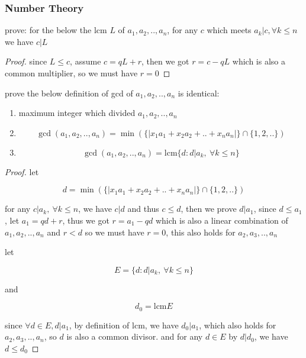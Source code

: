 \subsubsection{Number Theory}

\begin{exercise}
    prove: for the below the lcm $L$ of $a_1,a_2,..,a_n$, for any $c$ which meets $a_k | c, \forall k \le n$
    we have $c | L$
\end{exercise}

\begin{proof}
   since $L \le c$, assume $c = qL + r$, then we got $r = c - qL$ which is also a common multiplier,
   so we must have $r = 0$
\end{proof}


\begin{exercise}
    prove the below definition of gcd of $a_1,a_2,..,a_n$ is identical:

    \begin{enumerate}
        \item maximum integer which divided $a_1,a_2,..,a_n$

        \item

        \[
            \gcd(a_1,a_2,..,a_n) = \min \left( \{ \left|x_1a_1 + x_2a_2 + .. + x_na_n \right| \} \cap \{1,2,..\} \right)
        \]

        \item 

        \[
            \gcd(a_1,a_2,..,a_n) = \mathrm{lcm} \{ d: d | a_k,\: \forall k \le n \}
        \]
    \end{enumerate}
\end{exercise}

\begin{proof}
    let 

    \[
        d = \min \left( \{ \left|x_1a_1 + x_2a_2 + .. + x_na_n \right| \} \cap \{1,2,..\} \right)
    \]

    for any $c | a_k,\: \forall k \le n$, we have $c|d$ and thus $c \le d$, then we prove $d | a_1$,
    since $d \le a_1$, let $a_1 = qd + r$, thus we got $r = a_1 -qd$ which is also a linear combination of $a_1,a_2,..,a_n$ and $r < d$
    so we must have $r = 0$, this also holds for $a_2,a_3,..,a_n$


    let 

    \[
        E = \{ d: d | a_k,\: \forall k \le n \}
    \]

    and

    \[
        d_0 = \mathrm{lcm} E
    \]

    since $\forall d \in E, d | a_1$, by definition of $\mathrm{lcm}$,  we have $d_0 | a_1$,
    which also holds for $a_2,a_3,..,a_n$, so $d$ is also a common divisor. and for any $d \in E$
    by $d | d_0$, we have $d \le d_0$
\end{proof}

